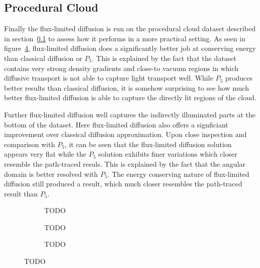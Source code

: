 \subsection{Procedural Cloud}
\label{sec:pn_results_clouds}

Finally the flux-limited diffusion is run on the procedural cloud dataset described in section~\ref{sec:pn_results_clouds} to assess how it performs in a more practical setting. As seen in figure~\ref{fig:fld_results_nebulae}, flux-limited diffusion does a significantly better job at conserving energy than classical diffusion or $P_5$. This is explained by the fact that the dataset contains very strong density gradients and close-to vacuum regions in which diffusive transport is not able to capture light transport well. While $P_5$ produces better results than classical diffusion, it is somehow surprising to see how much better flux-limited diffusion is able to capture the directly lit regions of the cloud.

Further flux-limited diffusion well captures the indirectly illuminated parts at the bottom of the dataset. Here flux-limited diffusion also offers a signficiant improvement over classical diffusion approximation. Upon close inspection and comparison with $P_5$, it can be seen that the flux-limited diffusion solution appears very flat while the $P_5$ solution exhibits finer variations which closer resemble the path-traced resuls. This is explained by the fact that the angular domain is better resolved with $P_5$. The energy conserving nature of flux-limited diffusion still produced a result, which much closer resembles the path-traced result than $P_5$.

\begin{figure}[h]
\centering
\begin{subfigure}{0.31\columnwidth}
\caption{TODO}
\label{fig:fld_results_nebulae_1}
\end{subfigure}
\hspace{0.01\columnwidth}
\begin{subfigure}{0.31\columnwidth}
\caption{TODO}
\label{fig:fld_results_nebulae_2}
\end{subfigure}
\hspace{0.01\columnwidth}
\begin{subfigure}{0.31\columnwidth}
\caption{TODO}
\label{fig:fld_results_nebulae_2}
\end{subfigure}%
\caption{TODO}
\label{fig:fld_results_nebulae}
\end{figure}

